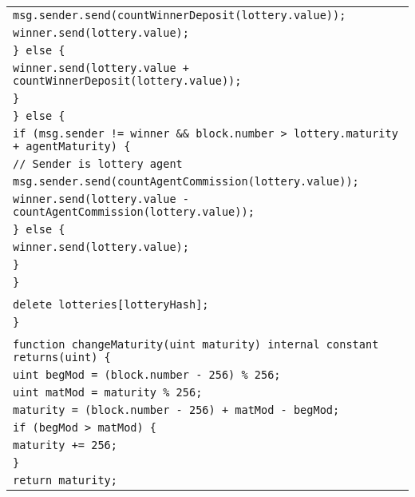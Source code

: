 \documentclass[a4paper]{article}
\begin{document}
\begin{tabularx}{\linewidth}{l}
        \qquad\qquad\qquad\qquad\texttt{msg.sender.send(countWinnerDeposit(lottery.value));}\\
        \qquad\qquad\qquad\qquad\texttt{winner.send(lottery.value);}\\
        \qquad\qquad\qquad\texttt{\} else \{}\\
        \qquad\qquad\qquad\qquad\texttt{winner.send(lottery.value + countWinnerDeposit(lottery.value));}\\
        \qquad\qquad\qquad\texttt{\}}\\
        \qquad\qquad\texttt{\} else \{}\\
        \qquad\qquad\qquad\texttt{if (msg.sender != winner \&\& block.number > lottery.maturity + agentMaturity) \{}\\
        \qquad\qquad\qquad\qquad\texttt{// Sender is lottery agent}\\
        \qquad\qquad\qquad\qquad\texttt{msg.sender.send(countAgentCommission(lottery.value));}\\
        \qquad\qquad\qquad\qquad\texttt{winner.send(lottery.value - countAgentCommission(lottery.value));}\\
        \qquad\qquad\qquad\texttt{\} else \{}\\
        \qquad\qquad\qquad\qquad\texttt{winner.send(lottery.value);}\\
        \qquad\qquad\qquad\texttt{\}}\\
        \qquad\qquad\texttt{\}}\\
        \\
        \qquad\qquad\texttt{delete lotteries[lotteryHash];}\\
        \qquad\texttt{\}}\\
        \\
        \qquad\texttt{function changeMaturity(uint maturity) internal constant returns(uint) \{}\\
        \qquad\qquad\texttt{uint begMod = (block.number - 256) \% 256;}\\
        \qquad\qquad\texttt{uint matMod = maturity \% 256;}\\
        \qquad\qquad\texttt{maturity = (block.number - 256) + matMod - begMod;}\\
        \qquad\qquad\texttt{if (begMod > matMod) \{}\\
        \qquad\qquad\qquad\texttt{maturity += 256;}\\
        \qquad\qquad\texttt{\}}\\
        \qquad\qquad\texttt{return maturity;}\\

\end{tabularx}
\end{document}
